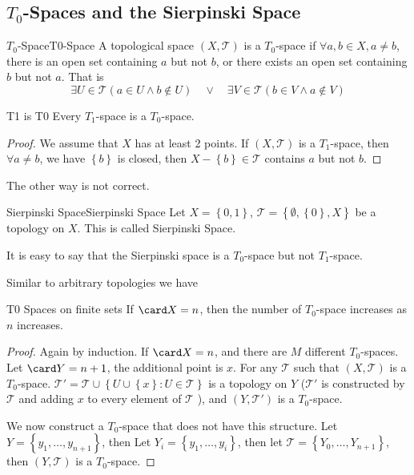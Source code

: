 \documentclass[../main.tex]{subfiles}
\begin{document}
\subsection{$T_0$-Spaces and the Sierpinski Space}
\begin{definition}{$T_0$-Space}{T0-Space}
A topological space $(X,\mathcal{T})$ is a $T_0$-space if $\forall a,b\in X, a\neq b$, there is an open set containing $a$ but not $b$, or there exists an open set containing $b$ but not $a$. That is
\begin{equation*}
\exists U\in \mathcal{T}(a\in U \land b\notin U)\quad \lor\quad \exists V\in \mathcal{T}(b\in V \land a\notin V)
\end{equation*}
\end{definition}

\begin{theorem}{}{T1 is T0}
Every $T_1$-space is a $T_0$-space.
\end{theorem}
\begin{proof}
We assume that $X$ has at least 2 points. If $(X,\mathcal{T})$ is a $T_1$-space, then $\forall a\neq b$, we have $\left\{ b \right\}$ is closed, then $X-\left\{ b \right\}\in \mathcal{T}$ contains $a$ but not $b$.
\end{proof}

The other way is not correct.
\begin{definition}{Sierpinski Space}{Sierpinski Space}
Let $X = \left\{ 0,1 \right\}$, $\mathcal{T}=\left\{ \emptyset , \left\{ 0 \right\}, X \right\}$ be a topology on $X$. This is called Sierpinski Space.
\end{definition}

It is easy to say that the Sierpinski space is a $T_0$-space but not $T_1$-space.

Similar to arbitrary topologies we have
\begin{proposition}{}{T0 Spaces on finite sets}
If $\card X = n$, then the number of $T_0$-space increases as $n$ increases.
\end{proposition}
\begin{proof}
Again by induction. If $\card X=n$, and there are $M$ different $T_0$-spaces. Let  $\card Y=n+1$, the additional point is $x$. For any $\mathcal{T}$ such that $(X, \mathcal{T})$ is a $T_0$-space. $\mathcal{T}' = \mathcal{T}\cup \left\{ U\cup \left\{ x \right\}: U\in \mathcal{T} \right\}$ is a topology on $Y$ ($\mathcal{T}'$ is constructed by $\mathcal{T}$ and adding $x$ to every element of $\mathcal{T}$ ), and $(Y,\mathcal{T}')$ is a $T_0$-space. 

We now construct a $T_0$-space that does not have this structure. Let $Y = \left\{ y_1, \ldots ,y_{n+1} \right\}$, then Let $Y_i = \left\{ y_1, \ldots ,y_i \right\}$, then let $\mathcal{T} = \left\{ Y_0, \ldots ,Y_{n+1} \right\}$, then $(Y,\mathcal{T})$ is a $T_0$-space.
\end{proof}
\end{document}
